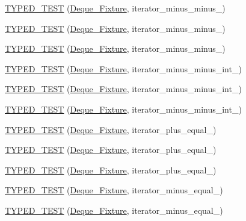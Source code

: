 \begin{DoxyCompactItemize}
\item 
\hyperlink{TestDeque_8c_09_09_af5e2343359834046c99f18856fa81092}{T\-Y\-P\-E\-D\-\_\-\-T\-E\-S\-T} (\hyperlink{structDeque__Fixture}{Deque\-\_\-\-Fixture}, iterator\-\_\-minus\-\_\-minus\-\_)
\item 
\hyperlink{TestDeque_8c_09_09_aab25fdcb1b787920b9bc7f478b1f85f1}{T\-Y\-P\-E\-D\-\_\-\-T\-E\-S\-T} (\hyperlink{structDeque__Fixture}{Deque\-\_\-\-Fixture}, iterator\-\_\-minus\-\_\-minus\-\_)
\item 
\hyperlink{TestDeque_8c_09_09_afa3993c4dfc10816f30f3ee5316dec89}{T\-Y\-P\-E\-D\-\_\-\-T\-E\-S\-T} (\hyperlink{structDeque__Fixture}{Deque\-\_\-\-Fixture}, iterator\-\_\-minus\-\_\-minus\-\_)
\item 
\hyperlink{TestDeque_8c_09_09_a168ddd06a1520ed8a1727d0f30c33ad8}{T\-Y\-P\-E\-D\-\_\-\-T\-E\-S\-T} (\hyperlink{structDeque__Fixture}{Deque\-\_\-\-Fixture}, iterator\-\_\-minus\-\_\-minus\-\_\-int\-\_)
\item 
\hyperlink{TestDeque_8c_09_09_a5cf5aee7091434f8a7cc42c8f3304269}{T\-Y\-P\-E\-D\-\_\-\-T\-E\-S\-T} (\hyperlink{structDeque__Fixture}{Deque\-\_\-\-Fixture}, iterator\-\_\-minus\-\_\-minus\-\_\-int\-\_)
\item 
\hyperlink{TestDeque_8c_09_09_afff47f108baa74c198945b9c0c2f4bd6}{T\-Y\-P\-E\-D\-\_\-\-T\-E\-S\-T} (\hyperlink{structDeque__Fixture}{Deque\-\_\-\-Fixture}, iterator\-\_\-minus\-\_\-minus\-\_\-int\-\_)
\item 
\hyperlink{TestDeque_8c_09_09_a24c32a09dd4c87cc45e3e062f3f2d172}{T\-Y\-P\-E\-D\-\_\-\-T\-E\-S\-T} (\hyperlink{structDeque__Fixture}{Deque\-\_\-\-Fixture}, iterator\-\_\-plus\-\_\-equal\-\_)
\item 
\hyperlink{TestDeque_8c_09_09_a900dd72e65780e0c1a1f82e07ec95db3}{T\-Y\-P\-E\-D\-\_\-\-T\-E\-S\-T} (\hyperlink{structDeque__Fixture}{Deque\-\_\-\-Fixture}, iterator\-\_\-plus\-\_\-equal\-\_)
\item 
\hyperlink{TestDeque_8c_09_09_a2da56c36fe507fe01496f7c5aa5e0d55}{T\-Y\-P\-E\-D\-\_\-\-T\-E\-S\-T} (\hyperlink{structDeque__Fixture}{Deque\-\_\-\-Fixture}, iterator\-\_\-plus\-\_\-equal\-\_)
\item 
\hyperlink{TestDeque_8c_09_09_adc6f355a01a84d3142937aa96ac23cf0}{T\-Y\-P\-E\-D\-\_\-\-T\-E\-S\-T} (\hyperlink{structDeque__Fixture}{Deque\-\_\-\-Fixture}, iterator\-\_\-minus\-\_\-equal\-\_)
\item 
\hyperlink{TestDeque_8c_09_09_adf3bff989dc6dc718ef3ba733ff7834e}{T\-Y\-P\-E\-D\-\_\-\-T\-E\-S\-T} (\hyperlink{structDeque__Fixture}{Deque\-\_\-\-Fixture}, iterator\-\_\-minus\-\_\-equal\-\_)

\end{DoxyCompactItemize}
